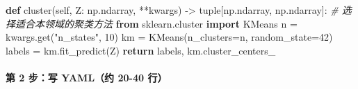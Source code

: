 \documentclass[
  12pt,
]{ctexart}
\newenvironment{Shaded}{}{}
\newcommand{\BuiltInTok}[1]{\textcolor[rgb]{0.00,0.50,0.00}{#1}}
\newcommand{\CommentTok}[1]{\textcolor[rgb]{0.38,0.63,0.69}{\textit{#1}}}
\newcommand{\ControlFlowTok}[1]{\textcolor[rgb]{0.00,0.44,0.13}{\textbf{#1}}}
\newcommand{\DecValTok}[1]{\textcolor[rgb]{0.25,0.63,0.44}{#1}}
\newcommand{\ImportTok}[1]{\textcolor[rgb]{0.00,0.50,0.00}{\textbf{#1}}}
\newcommand{\KeywordTok}[1]{\textcolor[rgb]{0.00,0.44,0.13}{\textbf{#1}}}
\newcommand{\NormalTok}[1]{#1}
\newcommand{\OperatorTok}[1]{\textcolor[rgb]{0.40,0.40,0.40}{#1}}
\newcommand{\StringTok}[1]{\textcolor[rgb]{0.25,0.44,0.63}{#1}}
\newcommand{\VariableTok}[1]{\textcolor[rgb]{0.10,0.09,0.49}{#1}}
\begin{document}
\begin{Shaded}
\begin{Highlighting}[]
    \KeywordTok{def}\NormalTok{ cluster(}\VariableTok{self}\NormalTok{, Z: np.ndarray, }\OperatorTok{**}\NormalTok{kwargs) }\OperatorTok{{-}\textgreater{}} \BuiltInTok{tuple}\NormalTok{[np.ndarray, np.ndarray]:}
        \CommentTok{\# 选择适合本领域的聚类方法}
        \ImportTok{from}\NormalTok{ sklearn.cluster }\ImportTok{import}\NormalTok{ KMeans}
\NormalTok{        n }\OperatorTok{=}\NormalTok{ kwargs.get(}\StringTok{"n\_states"}\NormalTok{, }\DecValTok{10}\NormalTok{)}
\NormalTok{        km }\OperatorTok{=}\NormalTok{ KMeans(n\_clusters}\OperatorTok{=}\NormalTok{n, random\_state}\OperatorTok{=}\DecValTok{42}\NormalTok{)}
\NormalTok{        labels }\OperatorTok{=}\NormalTok{ km.fit\_predict(Z)}
        \ControlFlowTok{return}\NormalTok{ labels, km.cluster\_centers\_}
\end{Highlighting}
\end{Shaded}

\paragraph{第 2 步：写 YAML（约 20-40
行）}\label{ux7b2c-2-ux6b65ux5199-yamlux7ea6-20-40-ux884c}
\end{document}
